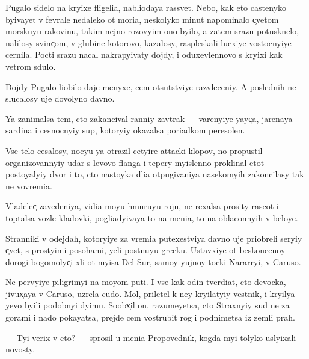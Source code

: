 \documentclass[10pt]{book}
\begin{document}
\newcommand{\e}{e}
\newcommand{\yi}{yi}
\newcommand{\ia}{ia}
\newcommand{\io}{io}
\newcommand{\y}{y}
\newcommand{\Y}{Y}

\newcommand{\yf}{y̆}

\newcommand{\X}{X̹}
\newcommand{\x}{x̹}
\newcommand{\C}{C̹}
\renewcommand{\c}{c̹}

Pugalo sidelo na kr{\yi}xe fligel{\ia}, nabl{\io}da{\y}a rassvet. Nebo, kak eto castenyko b{\yi}va{\y}et v fevrale nedaleko ot mor{\ia}, neskolyko minut napominalo {\c}vetom morsku{\y}u rakovinu, takim nejno-rozov{\yi}m ono b{\yi}lo, a zatem srazu potusknelo, nalilosy svin{\c}om, v glubine kotorovo, kazalosy, raspleskali lucxi{\y}e vostocn{\yi}{\y}e cernila. Pocti srazu nacal nakrap{\yi}vaty dojdy, i oduxevl{\e}nnovo s kr{\yi}xi kak vetrom sdulo.

Dojdy Pugalo l{\io}bilo daje menyxe, cem otsutstvi{\y}e razvleceni{\y}. A poslednih ne slucalosy uje dovolyno davno.

{\Y}a zanimalsa tem, cto zakancival ranni{\y} zavtrak — var{\e}n{\yi}{\y}e {\y}a{\y}{\c}a, jarena{\y}a sardina i cesnocn{\yi}{\y} sup, kotor{\yi}{\y} okazalsa por{\ia}dkom peresolen.

Vs{\e} telo cesalosy, noc{\y}u {\y}a otrazil cet{\yi}re attacki klopov, no propustil organizovann{\yi}{\y} udar s levovo flanga i tepery m{\yi}slenno proklinal etot posto{\y}al{\yi}{\y} dvor i to, cto nasto{\y}ka dl{\ia} otpugivani{\y}a nasekom{\yi}h zakoncilasy tak ne vovrem{\ia}.

Vladele{\c} zavedeni{\y}a, vid{\ia} mo{\y}u hmuru{\y}u roju, ne rexalsa prosity rascot i toptalsa vozle kladovki, pogl{\ia}d{\yi}va{\y}a to na men{\ia}, to na oblaconn{\yi}h v belo{\y}e.

Stranniki v odejdah, kotor{\yi}{\y}e za vrem{\ia} putexestvi{\y}a davno uje priobreli ser{\yi}{\y} {\c}vet, s prost{\yi}mi posohami, {\y}eli postnu{\y}u grecku. Ustavxi{\y}e ot beskonecno{\y} dorogi bogomoly{\c}i xli ot m{\yi}sa Del Sur, samo{\y} {\y}ujno{\y} tocki Nararr{\yi}, v Caruso.

Ne perv{\yi}{\y}e piligrim{\yi} na mo{\y}om puti. I vse kak odin tverd{\ia}t, cto devocka, jivu{\x}a{\y}a v Caruso, uzrela cudo. Mol, priletel k ne{\y} kr{\yi}lat{\yi}{\y} vestnik, i kr{\yi}l{\y}a {\y}evo b{\yi}li podobn{\yi} d{\yi}mu. Soob{\x}il on, razume{\y}etsa, cto Straxn{\yi}{\y} sud ne za gorami i nado poka{\y}atsa, prejde cem vostrubit rog i podnimetsa iz zemli prah.

— T{\yi} verix v eto? — sprosil u men{\ia} Propovednik, kogda m{\yi} tolyko usl{\yi}xali novosty.
\end{document}

